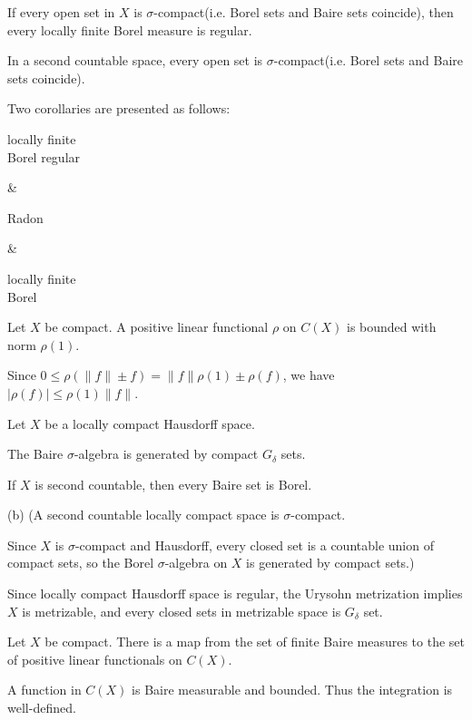 \documentclass{../../large}
\begin{document}
\begin{thm}
If every open set in $X$ is $\sigma$-compact(i.e. Borel sets and Baire sets coincide), then every locally finite Borel measure is regular.
\end{thm}
\begin{prop}
In a second countable space, every open set is $\sigma$-compact(i.e. Borel sets and Baire sets coincide).
\end{prop}

Two corollaries are presented as follows:
\begin{rd}[column sep={120pt,between origins}]
\parbox{7em}{\centering locally finite \\ Borel regular} \rar &
\parbox{5em}{\centering Radon} \rar {} &
\parbox{7em}{\centering locally finite \\ Borel} 
\end{rd}
\begin{prb}
Let $X$ be compact.
A positive linear functional $\rho$ on $C(X)$ is bounded with norm $\rho(1)$.
\end{prb}
\begin{pf}
Since $0\le\rho(\|f\|\pm f)=\|f\|\rho(1)\pm\rho(f)$, we have $|\rho(f)|\le\rho(1)\|f\|$.
\end{pf}

\begin{prb}
Let $X$ be a locally compact Hausdorff space.
\begin{parts}
\item The Baire $\sigma$-algebra is generated by compact $G_\delta$ sets.
\item If $X$ is second countable, then every Baire set is Borel.
\end{parts}
\end{prb}
\begin{sol}
(b)
(A second countable locally compact space is $\sigma$-compact.

Since $X$ is $\sigma$-compact and Hausdorff, every closed set is a countable union of compact sets, so the Borel $\sigma$-algebra on $X$ is generated by compact sets.)

Since locally compact Hausdorff space is regular, the Urysohn metrization implies $X$ is metrizable, and every closed sets in metrizable space is $G_\delta$ set.
\end{sol}
\begin{prb}
Let $X$ be compact.
There is a map from the set of finite Baire measures to the set of positive linear functionals on $C(X)$.
\end{prb}
\begin{sol}
A function in $C(X)$ is Baire measurable and bounded.
Thus the integration is well-defined.
\end{sol}
\end{document}
